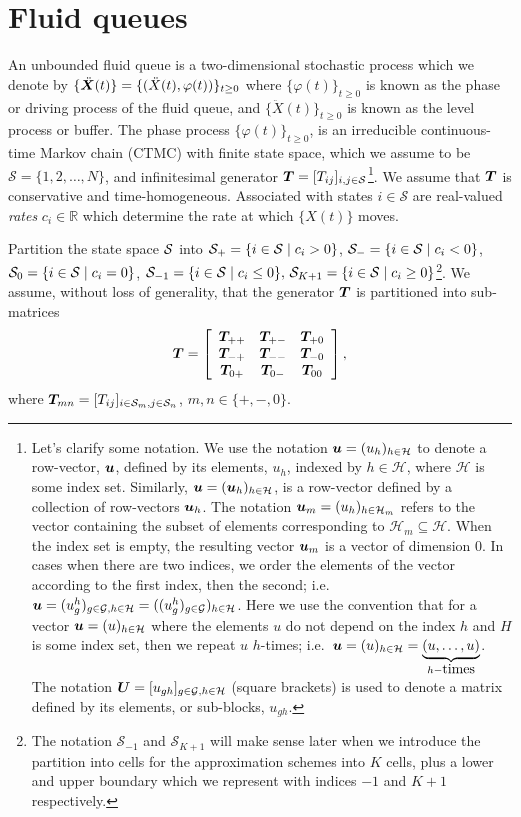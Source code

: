 \section{Fluid queues}\label{sec: fqs}
An unbounded fluid queue is a two-dimensional stochastic process which we denote by \(\{\ddot{\boldsymbol X}(t)\} = \{(\ddot X(t),\varphi(t))\}_{t\geq0}\) where \(\{\varphi(t)\}_{t\geq0}\) is known as the phase or driving process of the fluid queue, and \(\{\ddot X(t)\}_{t\geq0}\) is known as the level process or buffer. The phase process \(\{\varphi(t)\}_{t\geq0}\), is an irreducible continuous-time Markov chain (CTMC) with finite state space, which we assume to be \(\mathcal S=\{1,2,\dots,N\}\), and infinitesimal generator \(\boldsymbol T= [T_{ij}]_{i,j\in\mathcal S}\)\footnote{Let's clarify some notation. We use the notation \(\boldsymbol u = (u_h)_{h\in \mathcal H}\) to denote a row-vector, \(\boldsymbol u\), defined by its elements, \(u_h\), indexed by \(h\in\mathcal H\), where \(\mathcal H\) is some index set. Similarly, \(\boldsymbol u = (\boldsymbol u_h)_{h\in\mathcal H}\), is a row-vector defined by a collection of row-vectors \(\boldsymbol u_h\). The notation \(\boldsymbol u_m=(u_h)_{h\in\mathcal H_m}\) refers to the vector containing the subset of elements corresponding to \(\mathcal H_m\subseteq \mathcal H\). When the index set is empty, the resulting vector \(\boldsymbol u_m\) is a vector of dimension 0. In cases when there are two indices, we order the elements of the vector according to the first index, then the second; i.e.~\(\boldsymbol u = (u_{g}^h)_{g\in\mathcal G,h\in\mathcal H} = ((u_g^h)_{g\in\mathcal G})_{h\in\mathcal H}\). Here we use the convention that for a vector \(\boldsymbol u=(u)_{h\in \mathcal H}\) where the elements \(u\) do not depend on the index \(h\) and \(H\) is some index set, then we repeat \(u\) \(h\)-times; i.e.~\(\boldsymbol u = (u)_{h\in \mathcal H} =\underbrace{(u,\dots,u)}_{h-\mbox{times}}\). The notation \(\boldsymbol U = [u_{gh}]_{g\in\mathcal G, h\in\mathcal H}\) (square brackets) is used to denote a matrix defined by its elements, or sub-blocks, \(u_{gh}\).}. We assume that \(\boldsymbol T\) is {conservative} and time-homogeneous. Associated with states \(i\in\mathcal S\) are real-valued \emph{rates} \(c_i\in\mathbb R\) which determine the rate at which \(\{X(t)\}\) moves. 

Partition the state space \(\mathcal{S}\) into \(\mathcal{S}_+ = \{i\in\mathcal{S}\mid c_i>0\}\), \(\mathcal{S}_- = \{i\in\mathcal{S}\mid c_i<0\}\), \(\mathcal{S}_0 = \{i\in\mathcal{S}\mid c_i=0\}\), \(\mathcal S_{-1}=\{i\in\mathcal{S}\mid c_i\leq0\},\, \mathcal S_{K+1}=\{i\in\mathcal{S}\mid c_i\geq0\}\)\footnote{The notation \(\mathcal S_{-1}\) and \(\mathcal S_{K+1}\) will make sense later when we introduce the partition into cells for the approximation schemes into \(K\) cells, plus a lower and upper boundary which we represent with indices \(-1\) and \(K+1\) respectively.}. We assume, without loss of generality, that the generator \(\boldsymbol T\) is partitioned into sub-matrices
\[\boldsymbol T = \left[\begin{array}{ccc}\boldsymbol T_{++} & \boldsymbol T_{+-} & \boldsymbol T_{+0} \\ \boldsymbol T_{-+} & \boldsymbol T_{--} & \boldsymbol T_{-0} \\ \boldsymbol T_{0+} & \boldsymbol T_{0-} & \boldsymbol T_{00}  \end{array}\right],\]
where \(\boldsymbol T_{mn} = [T_{ij}]_{i\in\mathcal S_m, j\in\mathcal S_n}\), \(m,n\in\{+,-,0\}\).

